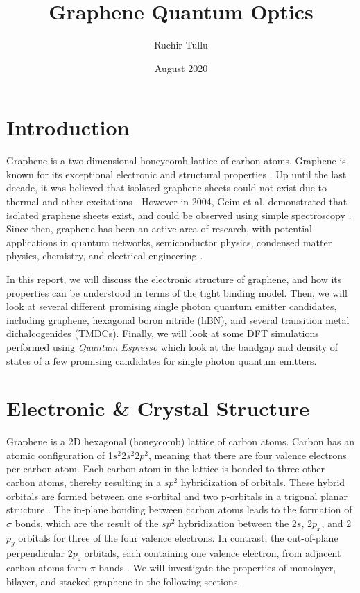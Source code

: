 \documentclass[]{article}
\title{Graphene Quantum Optics}
\author{Ruchir Tullu}
\date{August 2020}
\begin{document}



\newpage
\tableofcontents
\newpage


\section{Introduction}
Graphene is a two-dimensional honeycomb lattice of carbon atoms. Graphene is known for its exceptional electronic and structural properties \cite{The_Electronic_Properties_of_Graphene, Properties_of_graphene:_a_theoretical_perspective}. Up until the last decade, it was believed that isolated graphene sheets could not exist due to thermal and other excitations \cite{Lecture5}. However in 2004, Geim et al. demonstrated that isolated graphene sheets exist, and could be observed using simple spectroscopy \cite{Graphene_Scotch_Tape}. Since then, graphene has been an active area of research, with potential applications in quantum networks, semiconductor physics, condensed matter physics, chemistry, and electrical engineering \cite{Properties_of_graphene:_a_theoretical_perspective}. 
\newline

In this report, we will discuss the electronic structure of graphene, and how its properties can be understood in terms of the tight binding model. Then, we will look at several different promising single photon quantum emitter candidates, including graphene, hexagonal boron nitride (hBN), and several transition metal dichalcogenides (TMDCs). Finally, we will look at some DFT simulations performed using \textit{Quantum Espresso} \cite{quantum_espresso} which look at the bandgap and density of states of a few promising candidates for single photon quantum emitters. 



\section{Electronic \& Crystal Structure}

Graphene is a 2D hexagonal (honeycomb) lattice of carbon atoms. Carbon has an atomic configuration of 1$s^2$2$s^2$2$p^2$, meaning that there are four valence electrons per carbon atom. Each carbon atom in the lattice is bonded to three other carbon atoms, thereby resulting in a $sp^2$ hybridization of orbitals. These hybrid orbitals are formed between one s-orbital and two p-orbitals in a trigonal planar structure \cite{The_Electronic_Properties_of_Graphene}. The in-plane bonding between carbon atoms leads to the formation of $\sigma$ bonds, which are the result of the $sp^2$ hybridization between the 2$s$, 2$p_x$, and 2$p_y$ orbitals for three of the four valence electrons. In contrast,  the out-of-plane perpendicular 2$p_z$ orbitals, each containing one valence electron, from adjacent carbon atoms form $\pi$ bands \cite{Properties_of_graphene:_a_theoretical_perspective}. We will investigate the properties of monolayer, bilayer, and stacked graphene in the following sections.
\end{document}
